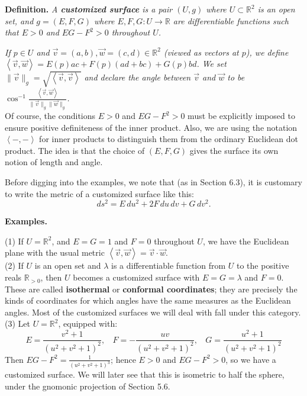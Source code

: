 \documentclass[leqno]{book}
\begin{document}
\noindent\textbf{Definition.} \emph{A \textbf{customized surface} is a pair $(U,g)$ where $U\subset\mathbb R^2$ is an open set, and $g=(E,F,G)$ where $E,F,G:U\to\mathbb R$ are differentiable functions such that $E>0$ and $EG-F^2>0$ throughout $U$.}

\emph{If $p\in U$ and $\vec v=(a,b),\vec w=(c,d)\in\mathbb R^2$ (viewed as vectors at $p$), we define $\left<\vec v,\vec w\right>=E(p)ac+F(p)(ad+bc)+G(p)bd$.  We set $\|\vec v\|_g=\sqrt{\left<\vec v,\vec v\right>}$ and declare the angle between $\vec v$ and $\vec w$ to be $\cos^{-1}\frac{\left<\vec v,\vec w\right>}{\|\vec v\|_g\|\vec w\|_g}$.}\\

\noindent Of course, the conditions $E>0$ and $EG-F^2>0$ must be explicitly imposed to ensure positive definiteness of the inner product.  Also, we are using the notation $\left<-,-\right>$ for inner products to distinguish them from the ordinary Euclidean dot product.  The idea is that the choice of $(E,F,G)$ gives the surface its own notion of length and angle.

Before digging into the examples, we note that (as in Section 6.3), it is customary to write the metric of a customized surface like this:
$$ds^2=E\,du^2+2F\,du\,dv+G\,dv^2.$$

\noindent\textbf{Examples.}

(1) If $U=\mathbb R^2$, and $E=G=1$ and $F=0$ throughout $U$, we have the Euclidean plane with the usual metric $\left<\vec v,\vec w\right>=\vec v\cdot\vec w$.\\

(2) If $U$ is an open set and $\lambda$ is a differentiable function from $U$ to the positive reals $\mathbb R_{>0}$, then $U$ becomes a customized surface with $E=G=\lambda$ and $F=0$.  These are called \textbf{isothermal} or \textbf{conformal coordinates}; they are precisely the kinds of coordinates for which angles have the same measures as the Euclidean angles.  Most of the customized surfaces we will deal with fall under this category.\\

(3) Let $U=\mathbb R^2$, equipped with:
$$E=\frac{v^2+1}{(u^2+v^2+1)^2},~~~~F=-\frac{uv}{(u^2+v^2+1)^2},~~~~G=\frac{u^2+1}{(u^2+v^2+1)^2}$$
Then $EG-F^2=\frac{1}{(u^2+v^2+1)^3}$; hence $E>0$ and $EG-F^2>0$, so we have a customized surface.  We will later see that this is isometric to half the sphere, under the gnomonic projection of Section 5.6.\\
\end{document}
